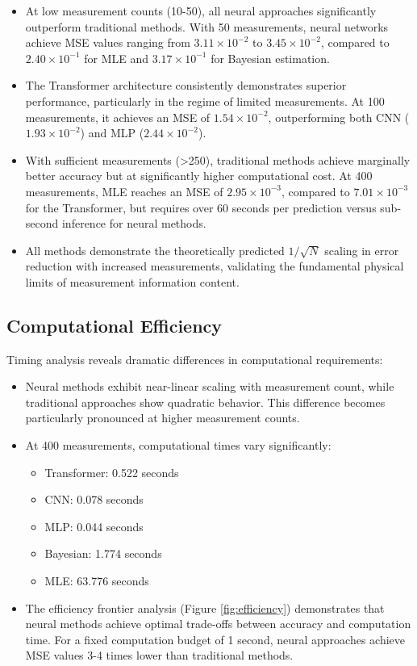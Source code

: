 \documentclass{optica-article}
\begin{document}
\begin{itemize}
\item At low measurement counts (10-50), all neural approaches significantly outperform traditional methods. With 50 measurements, neural networks achieve MSE values ranging from $3.11 \times 10^{-2}$ to $3.45 \times 10^{-2}$, compared to $2.40 \times 10^{-1}$ for MLE and $3.17 \times 10^{-1}$ for Bayesian estimation.

\item The Transformer architecture consistently demonstrates superior performance, particularly in the regime of limited measurements. At 100 measurements, it achieves an MSE of $1.54 \times 10^{-2}$, outperforming both CNN ($1.93 \times 10^{-2}$) and MLP ($2.44 \times 10^{-2}$).

\item With sufficient measurements (>250), traditional methods achieve marginally better accuracy but at significantly higher computational cost. At 400 measurements, MLE reaches an MSE of $2.95 \times 10^{-3}$, compared to $7.01 \times 10^{-3}$ for the Transformer, but requires over 60 seconds per prediction versus sub-second inference for neural methods.

\item All methods demonstrate the theoretically predicted $1/\sqrt{N}$ scaling in error reduction with increased measurements, validating the fundamental physical limits of measurement information content.
\end{itemize}

\subsection{Computational Efficiency}

Timing analysis reveals dramatic differences in computational requirements:

\begin{itemize}
\item Neural methods exhibit near-linear scaling with measurement count, while traditional approaches show quadratic behavior. This difference becomes particularly pronounced at higher measurement counts.

\item At 400 measurements, computational times vary significantly:
\begin{itemize}
\item Transformer: 0.522 seconds
\item CNN: 0.078 seconds
\item MLP: 0.044 seconds
\item Bayesian: 1.774 seconds
\item MLE: 63.776 seconds
\end{itemize}

\item The efficiency frontier analysis (Figure \ref{fig:efficiency}) demonstrates that neural methods achieve optimal trade-offs between accuracy and computation time. For a fixed computation budget of 1 second, neural approaches achieve MSE values 3-4 times lower than traditional methods.
\end{itemize}
\end{document}
